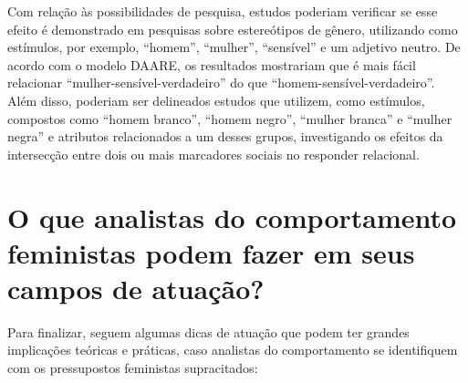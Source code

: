 Com relação às possibilidades de pesquisa, estudos poderiam verificar se esse efeito é demonstrado em pesquisas sobre estereótipos de gênero, utilizando como estímulos, por exemplo, ``homem'', ``mulher'', ``sensível'' e um adjetivo neutro. De acordo com o modelo DAARE, os resultados mostrariam que é mais fácil relacionar ``mulher-sensível-verdadeiro'' do que ``homem-sensível-verdadeiro''. Além disso, poderiam ser delineados estudos que utilizem, como estímulos, compostos como ``homem branco'', ``homem negro'', ``mulher branca'' e ``mulher negra'' e atributos relacionados a um desses grupos, investigando os efeitos da intersecção entre dois ou mais marcadores sociais no responder relacional.

\section{O que analistas do comportamento feministas podem fazer em seus campos de atuação?}

Para finalizar, seguem algumas dicas de atuação que podem ter grandes implicações teóricas e práticas, caso analistas do comportamento se identifiquem com os pressupostos feministas supracitados:

